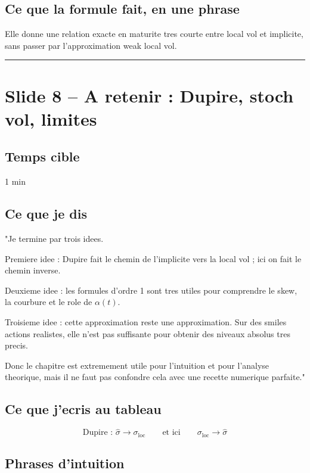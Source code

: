 \documentclass[11pt,a4paper]{article}
\begin{document}
\subsection{Ce que la formule fait, en une phrase}

Elle donne une relation exacte en maturite tres courte entre local vol et implicite, sans passer par l'approximation weak local vol.

\bigskip\hrule\bigskip

\section{Slide 8 -- A retenir : Dupire, stoch vol, limites}

\subsection{Temps cible}
1 min

\subsection{Ce que je dis}

"Je termine par trois idees.

Premiere idee : Dupire fait le chemin de l'implicite vers la local vol ; ici on fait le chemin inverse.

Deuxieme idee : les formules d'ordre 1 sont tres utiles pour comprendre le skew, la courbure et le role de \(\alpha(t)\).

Troisieme idee : cette approximation reste une approximation. Sur des smiles actions realistes, elle n'est pas suffisante pour obtenir des niveaux absolus tres precis.

Donc le chapitre est extremement utile pour l'intuition et pour l'analyse theorique, mais il ne faut pas confondre cela avec une recette numerique parfaite."

\subsection{Ce que j'ecris au tableau}

\[
\text{Dupire : } \hat{\sigma}\to \sigma_{\mathrm{loc}}
\qquad\text{et ici}\qquad
\sigma_{\mathrm{loc}}\to \hat{\sigma}
\]

\subsection{Phrases d'intuition}
\end{document}
